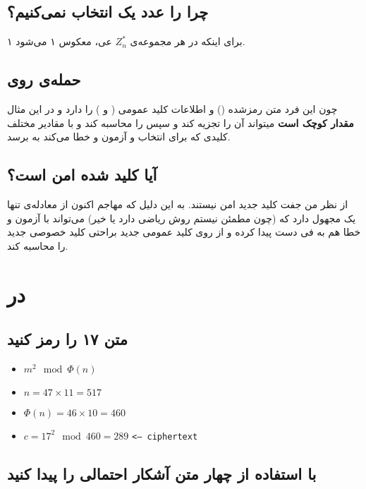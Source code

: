 \documentclass{article}
\begin{document}
\subsection{چرا  را عدد یک انتخاب نمی‌کنیم؟}
برای اینکه در هر مجموعه‌ی 
$Z^*_n$
عی، معکوس ۱ می‌شود ۱.

\subsection{حمله‌ی  روی }
چون این فرد متن رمزشده () و اطلاعات کلید عمومی ( و ) را دارد و در این مثال \textbf{مقدار  کوچک است} میتواند آن را تجزیه کند و سپس \lr{$\Phi$} را محاسبه کند و با مقادیر مختلف کلیدی که برای  انتخاب و آزمون و خطا می‌کند به  برسد.
\subsection{آیا کلید  شده امن است؟}
از نظر من جفت کلید جدید امن نیستند. به این دلیل که مهاجم اکنون از معادله‌ی 
تنها یک مجهول دارد که (چون مطمئن نیستم روش ریاضی دارد یا خیر) می‌تواند با آزمون و خطا هم به فی دست پیدا کرده و از روی کلید عمومی جدید براحتی کلید خصوصی جدید را محاسبه کند.

\section{در }
\subsection{متن ۱۷ را رمز کنید}
\begin{latin}
\begin{itemize}
\item[] $m^2 \mod \Phi(n)$
\item[] $n = 47\times11 = 517$
\item[] $\Phi(n) = 46\times10 = 460$
\item[] $c = 17^2 \mod 460 = 289$  \texttt{<-- ciphertext}
\end{itemize}
\end{latin}

\subsection{با استفاده از  چهار متن آشکار احتمالی را پیدا کنید}
\end{document}
